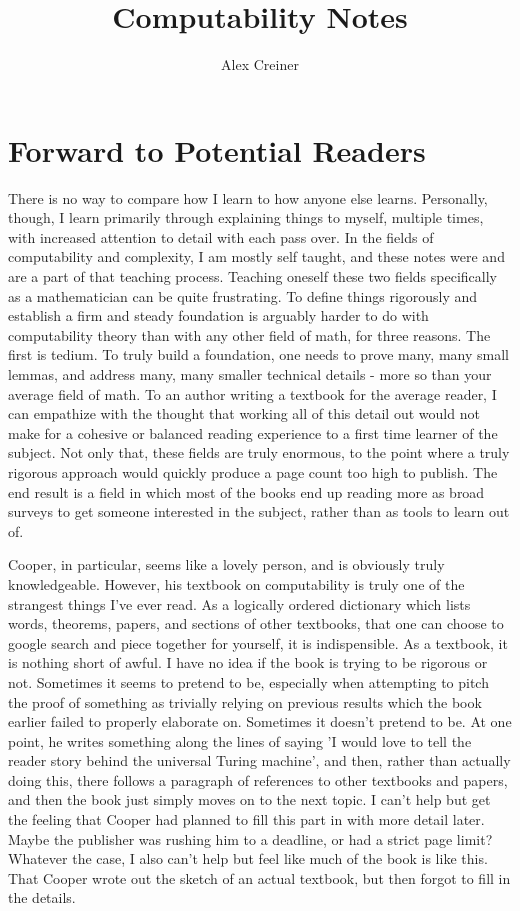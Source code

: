 \documentclass{article}
\title{Computability Notes}
\author{Alex Creiner}
\theoremstyle{definition}
\theoremstyle{plain}
\theoremstyle{theorem}
\begin{document}
\maketitle
\iffalse
\section{Forward to Potential Readers}
	There is no way to compare how I learn to how anyone else learns. Personally, though, I learn primarily through explaining things to myself, multiple times, with increased attention to detail with each pass over. In the fields of computability and complexity, I am mostly self taught, and these notes were and are a part of that teaching process. Teaching oneself these two fields specifically as a mathematician can be quite frustrating. To define things rigorously and establish a firm and steady foundation is arguably harder to do with computability theory than with any other field of math, for three reasons. The first is tedium. To truly build a foundation, one needs to prove many, many small lemmas, and address many, many smaller technical details - more so than your average field of math. To an author writing a textbook for the average reader, I can empathize with the thought that working all of this detail out would not make for a cohesive or balanced reading experience to a first time learner of the subject. Not only that, these fields are truly enormous, to the point where a truly rigorous approach would quickly produce a page count too high to publish. The end result is a field in which most of the books end up reading more as broad surveys to get someone interested in the subject, rather than as tools to learn out of. 
	\par Cooper, in particular, seems like a lovely person, and is obviously truly knowledgeable. However, his textbook on computability is truly one of the strangest things I've ever read. As a logically ordered dictionary which lists words, theorems, papers, and sections of other textbooks, that one can choose to google search and piece together for yourself, it is indispensible. As a textbook, it is nothing short of awful. I have no idea if the book is trying to be rigorous or not. Sometimes it seems to pretend to be, especially when attempting to pitch the proof of something as trivially relying on previous results which the book earlier failed to properly elaborate on. Sometimes it doesn't pretend to be. At one point, he writes something along the lines of saying 'I would love to tell the reader story behind the universal Turing machine', and then, rather than actually doing this, there follows a paragraph of references to other textbooks and papers, and then the book just simply moves on to the next topic. I can't help but get the feeling that Cooper had planned to fill this part in with more detail later. Maybe the publisher was rushing him to a deadline, or had a strict page limit? Whatever the case, I also can't help but feel like much of the book is like this. That Cooper wrote out the sketch of an actual textbook, but then forgot to fill in the details. 
\end{document}
